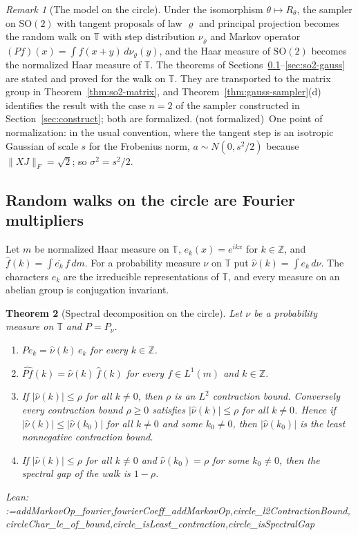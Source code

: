 \documentclass[11pt]{amsart}
\makeatletter
\newtheorem{theorem}{Theorem}[section]
\theoremstyle{definition}
\theoremstyle{remark}
\newtheorem{remark}[theorem]{Remark}
\newcommand{\@leanlist}[1]{\def\@leansep{}\@for\@leanname:=#1\do{\@leansep
  \texttt{\expandafter\detokenize\expandafter{\@leanname}}\def\@leansep{, }}}
\newcommand{\lean}[1]{\par\smallskip\noindent
  {\footnotesize\normalfont\raggedright\textsf{Lean:} \@leanlist{#1}\par}}
\newcommand{\notformal}{\textup{(not formalized)}}
\newcommand{\Z}{\mathbb{Z}}
\newcommand{\T}{\mathbb{T}}
\newcommand{\SO}{\mathrm{SO}}
\newcommand{\fro}[1]{\lVert #1\rVert_{F}}
\makeatother
\begin{document}
\begin{remark}[The model on the circle]\label{rem:so2-model}
Under the isomorphism $\theta\mapsto R_\theta$, the sampler on $\SO(2)$ with tangent proposals
of law $\varrho$ and principal projection becomes the random walk on $\T$ with step
distribution $\nu_\varrho$ and Markov operator $(Pf)(x)=\int f(x+y)\,d\nu_\varrho(y)$, and the
Haar measure of $\SO(2)$ becomes the normalized Haar measure of $\T$.  The theorems of
Sections~\ref{sec:circle-fourier}--\ref{sec:so2-gauss} are stated and proved for the walk on
$\T$.  They are transported to the matrix group in Theorem~\ref{thm:so2-matrix}, and
Theorem~\ref{thm:gauss-sampler}(d) identifies the result with the case $n=2$ of the sampler
constructed in Section~\ref{sec:construct}; both are formalized.  \notformal\ One point of
normalization: in the usual convention, where the tangent step is an isotropic Gaussian of
scale $s$ for the Frobenius norm, $a\sim N(0,s^2/2)$ because $\fro{XJ}=\sqrt2$; so
$\sigma^2=s^2/2$.
\end{remark}

\subsection{Random walks on the circle are Fourier multipliers}\label{sec:circle-fourier}
Let $m$ be normalized Haar measure on $\T$, $e_k(x)=e^{ikx}$ for $k\in\Z$, and
$\hat f(k)=\int\overline{e_k}\,f\,dm$.  For a probability measure $\nu$ on $\T$ put
$\hat\nu(k)=\int e_k\,d\nu$.  The characters $e_k$ are the irreducible representations of $\T$,
and every measure on an abelian group is conjugation invariant.

\begin{theorem}[Spectral decomposition on the circle]\label{thm:circle}
Let $\nu$ be a probability measure on $\T$ and $P=P_\nu$.
\begin{enumerate}
\item[(a)] $Pe_k=\hat\nu(k)\,e_k$ for every $k\in\Z$.
\item[(b)] $\widehat{Pf}(k)=\hat\nu(k)\,\hat f(k)$ for every $f\in L^1(m)$ and $k\in\Z$.
\item[(c)] If $|\hat\nu(k)|\le\rho$ for all $k\ne0$, then $\rho$ is an $L^2$ contraction bound.
Conversely every contraction bound $\rho\ge0$ satisfies $|\hat\nu(k)|\le\rho$ for all $k\ne0$.
Hence if $|\hat\nu(k)|\le|\hat\nu(k_0)|$ for all $k\ne0$ and some $k_0\ne0$, then
$|\hat\nu(k_0)|$ is the least nonnegative contraction bound.
\item[(d)] If $|\hat\nu(k)|\le\rho$ for all $k\ne0$ and $\hat\nu(k_0)=\rho$ for some $k_0\ne0$,
then the spectral gap of the walk is $1-\rho$.
\end{enumerate}
\lean{addMarkovOp_fourier,fourierCoeff_addMarkovOp,circle_l2ContractionBound,circleChar_le_of_bound,circle_isLeast_contraction,circle_isSpectralGap}
\end{theorem}
\end{document}
